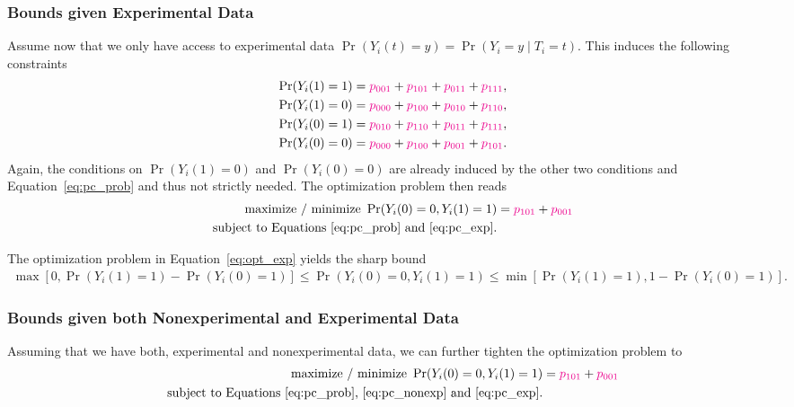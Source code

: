 \documentclass[11pt]{exam}
\begin{document}
\subsubsection{Bounds given Experimental Data}
Assume now that we only have access to experimental data $\Pr(Y_i(t) = y) = \Pr(Y_i = y \mid T_i = t)$. This induces the following constraints
\begin{align}\label{eq:pc_exp}
    \Pr(Y_i(1) = 1) &= \textcolor{magenta}{p_{0 0 1}} + \textcolor{magenta}{p_{1 0 1}} + \textcolor{magenta}{p_{0 1 1}} + \textcolor{magenta}{p_{1 1 1}},
    \notag
    \\
    \Pr(Y_i(1) = 0) &= \textcolor{magenta}{p_{0 0 0}} + \textcolor{magenta}{p_{1 0 0}} + \textcolor{magenta}{p_{0 1 0}} + \textcolor{magenta}{p_{1 1 0}},
    \\
    \Pr(Y_i(0) = 1) &= \textcolor{magenta}{p_{0 1 0}} + \textcolor{magenta}{p_{1 1 0}} + \textcolor{magenta}{p_{0 1 1}} + \textcolor{magenta}{p_{1 1 1}},
    \notag
    \\
    \Pr(Y_i(0) = 0) &= \textcolor{magenta}{p_{0 0 0}} + \textcolor{magenta}{p_{1 0 0}} + \textcolor{magenta}{p_{0 0 1}} + \textcolor{magenta}{p_{1 0 1}}.
    \notag
\end{align}
Again, the conditions on $\Pr(Y_i(1) = 0)$ and $\Pr(Y_i(0) = 0)$ are already induced by the other two conditions and Equation~\eqref{eq:pc_prob} and thus not strictly needed. The optimization problem then reads
\begin{align}\label{eq:opt_exp}
    \text{maximize / minimize } \Pr(Y_i(0) = 0, Y_i(1) = 1) &= \textcolor{magenta}{p_{1 0 1}} + \textcolor{magenta}{p_{0 0 1}}
    \\
    \text{subject to Equations~\eqref{eq:pc_prob} and~\eqref{eq:pc_exp}}.
    \notag
\end{align}

\begin{theorem}
    The optimization problem in Equation~\eqref{eq:opt_exp} yields the sharp bound
    \begin{align*}
        \max[0, \Pr(Y_i(1) = 1) - \Pr(Y_i(0) = 1)] \leq \Pr(Y_i(0) = 0, Y_i(1) = 1) \leq \min[\Pr(Y_i(1) = 1), 1 - \Pr(Y_i(0) = 1)].
    \end{align*}
\end{theorem}

\subsubsection{Bounds given both Nonexperimental and Experimental Data}
Assuming that we have both, experimental and nonexperimental data, we can further tighten the optimization problem to
\begin{align}\label{eq:opt_both}
    \text{maximize / minimize } \Pr(Y_i(0) = 0, Y_i(1) = 1) &= \textcolor{magenta}{p_{1 0 1}} + \textcolor{magenta}{p_{0 0 1}}
    \\
    \text{subject to Equations~\eqref{eq:pc_prob},~\eqref{eq:pc_nonexp} and~\eqref{eq:pc_exp}}.
    \notag
\end{align}
\end{document}
